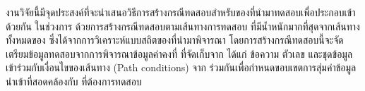 งานวิจัยนี้มีจุดประสงค์ที่จะนำเสนอวิธีการสร้างกรณีทดสอบสำหรับ{\sourcecode}ของ{\softwareComponent}ที่นำมาทดสอบเพื่อประกอบเข้าด้วยกัน
ในช่วงการ\FirstTimeDefine{\IntegrationTesting}{\IntegrationTestingEN} ด้วยการสร้างกรณีทดสอบตามเส้นทางการทดสอบ
ที่มีน้ำหนักมากที่สุดจากเส้นทางทั้งหมดของ{\scg} ซึ่งได้จากการวิเคราะห์แบบสถิตของ{\sourcecode}ที่นำมาพิจารณา 
โดยการสร้างกรณีทดสอบนี้จะจัดเตรียมข้อมูลทดสอบจากการพิจารณาข้อมูลค่าคงที่ ที่จัดเก็บจาก{\sourcecode} ได้แก่ ข้อความ ตัวเลข และชุดข้อมูล 
เข้าร่วมกับเงื่อนไขของเส้นทาง (Path conditions) จาก{\cfg} 
ร่วมกันเพื่อกำหนดขอบเขตการสุ่มค่าข้อมูลนำเข้าที่สอดคล้องกับ\FirstTimeDefine{\MethodSignature}{\MethodSignatureEN} ที่ต้องการทดสอบ
